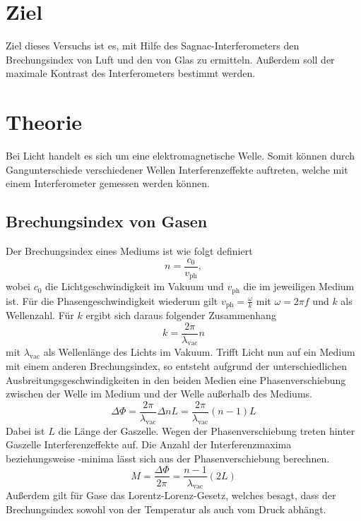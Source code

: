 \section{Ziel}
\label{sec:Ziel}
Ziel dieses Versuchs ist es, mit Hilfe des Sagnac-Interferometers den Brechungsindex von Luft und den von Glas zu ermitteln. Außerdem soll der maximale Kontrast des Interferometers bestimmt werden.

\section{Theorie}
\label{sec:theorie}
Bei Licht handelt es sich um eine elektromagnetische Welle. Somit können durch Gangunterschiede verschiedener Wellen Interferenzeffekte auftreten, welche mit einem Interferometer gemessen werden können.

\subsection{Brechungsindex von Gasen}
Der Brechungsindex eines Mediums ist wie folgt definiert
\begin{equation}
  n=\frac{c_0}{v_\mathrm{ph}},
\end{equation}
wobei $c_0$ die Lichtgeschwindigkeit im Vakuum und $v_\mathrm{ph}$ die im jeweiligen Medium ist. Für die Phasengeschwindigkeit wiederum gilt $v_\mathrm{ph}=\frac{\omega}{k}$ mit $\omega = 2\pi f$ und $k$ als Wellenzahl. Für $k$ ergibt sich daraus folgender Zusammenhang
\begin{equation}
  k=\frac{2\pi}{\lambda_\mathrm{vac}}n
\end{equation}
mit $\lambda_\mathrm{vac}$ als Wellenlänge des Lichts im Vakuum. Trifft Licht nun auf ein Medium mit einem anderen Brechungsindex, so entsteht aufgrund der unterschiedlichen Ausbreitungsgeschwindigkeiten in den beiden Medien eine Phasenverschiebung zwischen der Welle im Medium und der Welle außerhalb des Mediums.
\begin{equation}
  \Delta \Phi = \frac{2\pi}{\lambda_\mathrm{vac}}\Delta n L = \frac{2\pi}{\lambda_\mathrm{vac}}(n-1)L
\end{equation}
Dabei ist $L$ die Länge der Gaszelle. Wegen der Phasenverschiebung treten hinter Gaszelle Interferenzeffekte auf. Die Anzahl der Interferenzmaxima beziehungsweise -minima lässt sich aus der Phasenverschiebung berechnen.
\begin{equation}
  \label{eqn:gas}
  M=\frac{\Delta \Phi}{2\pi} = \frac{n-1}{\lambda_\mathrm{vac}}(2L)
\end{equation}
Außerdem gilt für Gase das Lorentz-Lorenz-Gesetz, welches besagt, dass der Brechungsindex sowohl von der Temperatur als auch vom Druck abhängt.

